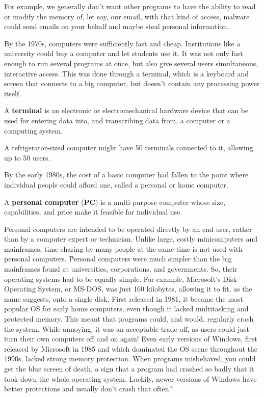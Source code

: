 \be
For example, we generally don't want other programs to have the ability to read or modify the memory of, let say, our
email, with that kind of access, malware could send emails on your behalf and maybe steal personal information.
\ee

By the 1970s, computers were sufficiently fast and cheap. Institutions like a university could buy a computer and let
students use it. It was not only fast enough to run several programs at once, but also give several users
simultaneous, interactive access. This was done through a terminal, which is a keyboard and screen that connects to a
big computer, but doesn't contain any processing power itself.

\bd[Terminal]
A \textbf{terminal} is an electronic or electromechanical hardware device that can be used for entering data into,
and transcribing data from, a computer or a computing system.
\ed

\be
A refrigerator-sized computer might have 50 terminals connected to it, allowing up to 50 users.
\ee

By the early 1980s, the cost of a basic computer had fallen to the point where individual people could afford one,
called a personal or home computer.

A \textbf{personal computer} (\textbf{PC}) is a multi-purpose computer whose size, capabilities, and price make it
feasible for individual use.
\ed

Personal computers are intended to be operated directly by an end user, rather than by a computer expert or
technician. Unlike large, costly minicomputers and mainframes, time-sharing by many people at the same time is not
used with personal computers. \v

Personal computers were much simpler than the big mainframes found at universities, corporations, and governments.
So, their operating systems had to be equally simple. For example, Microsoft's Disk Operating System, or MS-DOS, was
just 160 kilobytes, allowing it to fit, as the name suggests, onto a single disk. First released in 1981, it became
the most popular OS for early home computers, even though it lacked multitasking and protected memory. This meant
that programs could, and would, regularly crash the system. While annoying, it was an acceptable trade-off, as users
could just turn their own computers off and on again! Even early versions of Windows, first released by Microsoft in
1985 and which dominated the OS scene throughout the 1990s, lacked strong memory protection. When programs
misbehaved, you could get the blue screen of death, a sign that a program had crashed so badly that it took down the
whole operating system. Luckily, newer versions of Windows have better protections and usually don't crash that often.
\v


